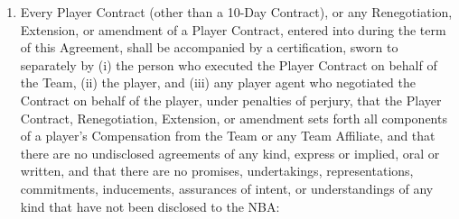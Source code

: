 \documentclass[
]{book}
\providecommand{\tightlist}{%
  \setlength{\itemsep}{0pt}\setlength{\parskip}{0pt}}
\begin{document}
\begin{enumerate}
\def\labelenumi{(\alph{enumi})}
\tightlist
\item
  Every Player Contract (other than a 10-Day Contract), or any Renegotiation, Extension, or amendment of a Player Contract, entered into during the term of this Agreement, shall be accompanied by a certification, sworn to separately by (i) the person who executed the Player Contract on behalf of the Team, (ii) the player, and (iii) any player agent who negotiated the Contract on behalf of the player, under penalties of perjury, that the Player Contract, Renegotiation, Extension, or amendment sets forth all components of a player's Compensation from the Team or any Team Affiliate, and that there are no undisclosed agreements of any kind, express or implied, oral or written, and that there are no promises, undertakings, representations, commitments, inducements, assurances of intent, or understandings of any kind that have not been disclosed to the NBA:


\end{enumerate}
\end{document}
